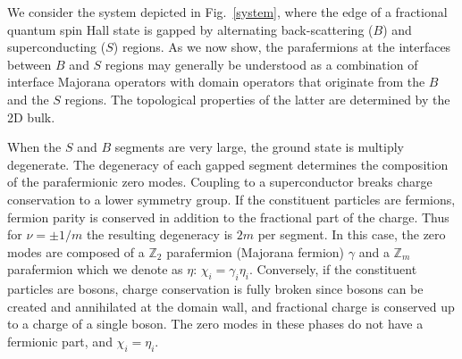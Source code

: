 \documentclass[twocolumn,aps,prb,showpacs]{revtex4-1}
\begin{document}
We consider the system depicted in Fig.~\ref{system}, where the edge of a fractional quantum spin Hall state is gapped by alternating back-scattering ($B$) and superconducting ($S$)  regions.
As we now show, the parafermions at the interfaces between  $B$ and $S$ regions may generally be understood as a combination of interface Majorana operators with domain operators that originate from the $B$ and the $S$ regions. The topological properties of the latter are determined by the 2D bulk.

When the $S$ and $B$ segments are very large, the ground state is multiply degenerate. The degeneracy of each gapped segment determines the composition  of the parafermionic zero modes.
Coupling to a superconductor breaks charge conservation to a lower symmetry group.
If the constituent particles are fermions, fermion parity is conserved  in addition to the fractional part of the charge. Thus for $\nu=\pm 1/m$ the resulting degeneracy is $2m$ per segment.  In this case, the zero modes are  composed of a $\mathbb{Z}_2$ parafermion (Majorana fermion) $\gamma $ and a $\mathbb{Z}_m$ parafermion which we denote as $\eta $: $\chi_i = \gamma_i\eta_i $.
Conversely, if the constituent particles are bosons, charge conservation is fully broken since bosons can be created and annihilated at the domain wall,  and fractional charge is conserved up to a charge of a single boson. The zero modes in these phases do not have a fermionic part, and  $\chi_i = \eta_i$.
\end{document}
